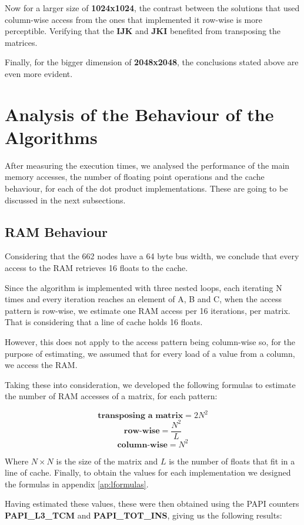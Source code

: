 \documentclass[twoside,twocolumn]{article}
\begin{document}
Now for a larger size of \textbf{1024x1024}, the contrast between the solutions that used column-wise access from the ones that implemented it row-wise is more perceptible. Verifying that the \textbf{IJK} and \textbf{JKI} benefited from transposing the matrices.

Finally, for the bigger dimension of \textbf{2048x2048}, the conclusions stated above are even more evident.

\section{Analysis of the Behaviour of the Algorithms}

After measuring the execution times, we analysed the performance of the main memory accesses, the number of floating point operations and the cache behaviour, for each of the dot product implementations. These are going to be discussed in the next subsections.

\subsection{RAM Behaviour}

Considering that the 662 nodes have a 64 byte bus width, we conclude that every access to the RAM retrieves 16 floats to the cache.

Since the algorithm is implemented with three nested loops, each iterating N times and every iteration reaches an element of A, B and C, when the access pattern is row-wise, we estimate one RAM access per 16 iterations, per matrix. That is considering that a line of cache holds 16 floats.

However, this does not apply to the access pattern being column-wise so, for the purpose of estimating, we assumed that for every load of a value from a column, we access the RAM.

Taking these into consideration, we developed the following formulas to estimate the number of RAM accesses of a matrix, for each pattern:

$$\textbf{transposing a matrix} = 2N^{2}$$
$$\textbf{row-wise} = \frac{N^{2}}{L}$$
$$\textbf{column-wise} = N^{2}$$

Where $N \times N$ is the size of the matrix and $L$ is the number of floats that fit in a line of cache. Finally, to obtain the values for each implementation we designed the formulas in appendix \ref{ap:lformulas}.

Having estimated these values, these were then obtained using the PAPI counters \textbf{PAPI\_L3\_TCM} and \textbf{PAPI\_TOT\_INS}, giving us the following results:
\end{document}
